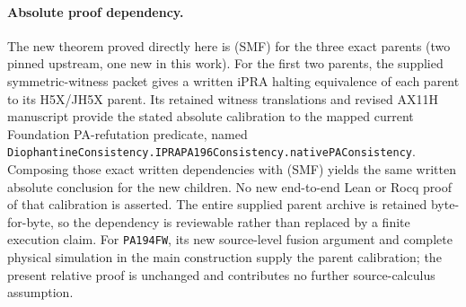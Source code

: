\paragraph{Absolute proof dependency.}
The new theorem proved directly here is (SMF) for the three exact
parents (two pinned upstream, one new in this work).  For the first two parents, the supplied symmetric-witness packet gives a written iPRA
halting equivalence of each parent to its H5X/JH5X parent.  Its retained
witness translations and revised AX11H manuscript provide the stated
absolute calibration to the mapped current Foundation PA-refutation
predicate, named
\texttt{DiophantineConsistency.IPRAPA196Consistency.nativePAConsistency}.
Composing those exact written dependencies with (SMF) yields the same
written absolute conclusion for the new children.  No new end-to-end
Lean or Rocq proof of that calibration is asserted.  The entire supplied
parent archive is retained byte-for-byte, so the dependency is reviewable
rather than replaced by a finite execution claim.  For \texttt{PA194FW},
its new source-level fusion argument and complete physical simulation in
the main construction supply the parent calibration; the present relative
proof is unchanged and contributes no further source-calculus assumption.
